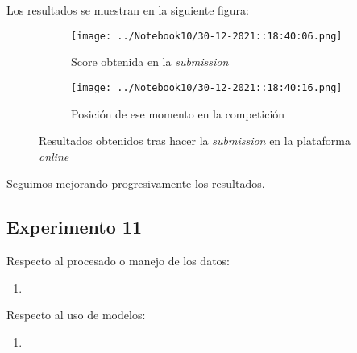 \documentclass[11pt]{article}
\begin{document}
Los resultados se muestran en la siguiente figura:

\begin{figure}[H]
    \centering

    \begin{subfigure}[b]{0.45 \textwidth}
        \texttt{[image: ../Notebook10/30-12-2021::18:40:06.png]}
        \caption{Score obtenida en la \emph{submission}}
    \end{subfigure}
    \begin{subfigure}[b]{0.45 \textwidth}
        \texttt{[image: ../Notebook10/30-12-2021::18:40:16.png]}
        \caption{Posición de ese momento en la competición}
    \end{subfigure}

    \caption{Resultados obtenidos tras hacer la \emph{submission} en la plataforma \emph{online}}
\end{figure}

Seguimos mejorando progresivamente los resultados.

\pagebreak

\subsection{Experimento 11}

Respecto al procesado o manejo de los datos:

\begin{enumerate}
    \item
\end{enumerate}

Respecto al uso de modelos:

\begin{enumerate}
    \item
\end{enumerate}



\end{document}

